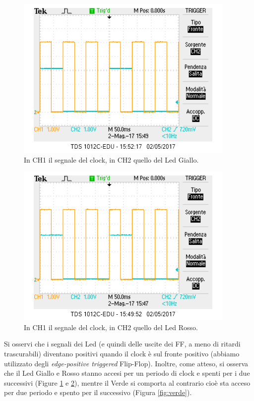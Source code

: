 \documentclass[10pt,a4paper]{article}
\begin{document}
\begin{figure}[!htb]
\centering
\includegraphics[scale=0.7]{clock-gialloverde.png}
\caption{In CH1 il segnale del clock, in CH2 quello del Led Giallo.\label{fig:giallo}}
\end{figure}

\begin{figure}[!htb]
\centering
\includegraphics[scale=0.7]{clock-rosso.png}
\caption{In CH1 il segnale del clock, in CH2 quello del Led Rosso.\label{fig:rosso}}
\end{figure}

Si osservi che i segnali dei Led (e quindi delle uscite dei FF, a meno di ritardi trascurabili) diventano positivi quando il clock è sul fronte positivo (abbiamo utilizzato degli \emph{edge-positive triggered} Flip-Flop). Inoltre, come atteso, si osserva che il Led Giallo e Rosso stanno accesi per un periodo di clock e spenti per i due successivi (Figure \ref{fig:giallo} e \ref{fig:rosso}), mentre il Verde si comporta al contrario cioè sta acceso per due periodo e spento per il successivo (Figura \ref{fig:verde}).
\end{document}
